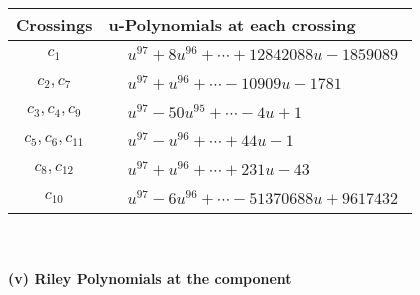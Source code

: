 \documentclass[1p]{elsarticle_modified}
\theoremstyle{definition}
\begin{document}
\begin{tabular}{m{50pt}|m{274pt}}
Crossings & \hspace{64pt}u-Polynomials at each crossing \\
\hline $$\begin{aligned}c_{1}\end{aligned}$$&$\begin{aligned}
&u^{97}+8 u^{96}+\cdots+12842088 u-1859089
\end{aligned}$\\
\hline $$\begin{aligned}c_{2},c_{7}\end{aligned}$$&$\begin{aligned}
&u^{97}+u^{96}+\cdots-10909 u-1781
\end{aligned}$\\
\hline $$\begin{aligned}c_{3},c_{4},c_{9}\end{aligned}$$&$\begin{aligned}
&u^{97}-50 u^{95}+\cdots-4 u+1
\end{aligned}$\\
\hline $$\begin{aligned}c_{5},c_{6},c_{11}\end{aligned}$$&$\begin{aligned}
&u^{97}- u^{96}+\cdots+44 u-1
\end{aligned}$\\
\hline $$\begin{aligned}c_{8},c_{12}\end{aligned}$$&$\begin{aligned}
&u^{97}+u^{96}+\cdots+231 u-43
\end{aligned}$\\
\hline $$\begin{aligned}c_{10}\end{aligned}$$&$\begin{aligned}
&u^{97}-6 u^{96}+\cdots-51370688 u+9617432
\end{aligned}$\\
\hline
\end{tabular}\\~\\
\newpage\renewcommand{\arraystretch}{1}
\flushleft \textbf{(v) Riley Polynomials at the component}\newline \\
\end{document}
